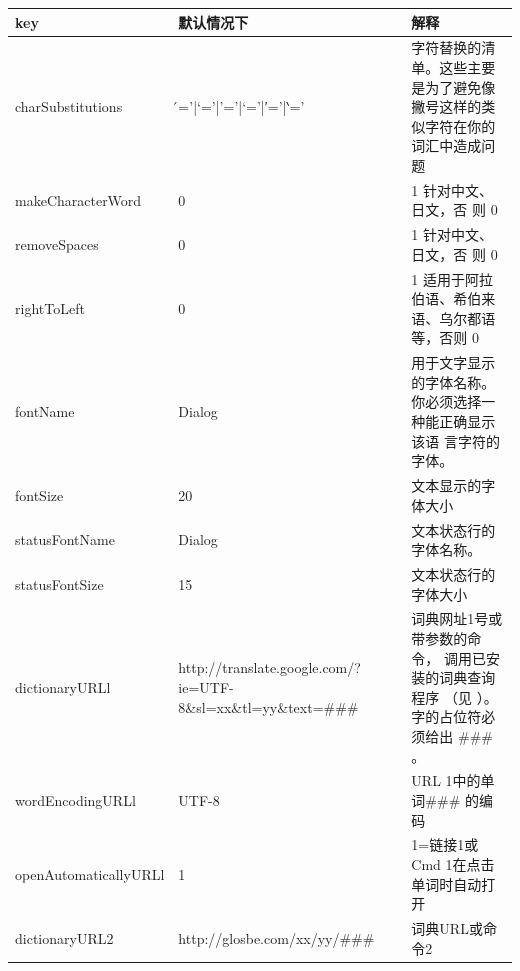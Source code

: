 \documentclass[cn,10pt,math=newtx,citestyle=gb7714-2015,bibstyle=gb7714-2015]{elegantbook}
\begin{document}
\renewcommand{\arraystretch}{1.3}%
\begin{table}[htbp]
\centering
\begin{tabularx}{\textwidth}{|X|X|X|}
\hline
	key & 默认情况下 &解释 \\ \hline
	charSubstitutions & ́='|`='|’='|‘='|′='|‵=' &字符替换的清单。这些主要是为了避免像撇号这样的类似字符在你的词汇中造成问题 \\ \hline

	makeCharacterWord & 0 & 1   针对中文、日文，否 则 0 \\ \hline
	removeSpaces &  0& 1     针对中文、日文，否 则 0 \\ \hline
	rightToLeft & 0 & 1    适用于阿拉伯语、希伯来语、乌尔都语等，否则   0 \\ \hline
	fontName & Dialog & 用于文字显示的字体名称。你必须选择一种能正确显示该语 言字符的字体。 \\ \hline
	fontSize & 20 & 文本显示的字体大小 \\ \hline
	statusFontName & Dialog & 文本状态行的字体名称。 \\ \hline
	statusFontSize & 15 & 文本状态行的字体大小 \\ \hline
	dictionaryURLl & http://translate.google.com/?ie=UTF-8\&sl=xx\&tl=yy\&text=\#\#\# & 词典网址1号或带参数的命令， 调用已安装的词典查询程序  （见  \nameref{与字典查询软件整合}）。字的占位符必须给出 \#\#\# 。 \\ \hline
	
	wordEncodingURLl & UTF-8 & URL 1中的单词\#\#\# 的编码 \\ \hline
	openAutomaticallyURLl & 1 & 1=链接1或Cmd 1在点击单词时自动打开 \\ \hline
	dictionaryURL2 & http://glosbe.com/xx/yy/\#\#\#  & 词典URL或命令2 \\ \hline
	

\end{tabularx}
\end{table}
\end{document}
